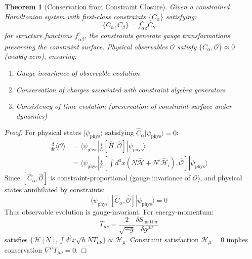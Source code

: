 \documentclass[11pt,a4paper]{article}
\newtheorem{theorem}{Theorem}[section]
\theoremstyle{remark}
\theoremstyle{definition}
\begin{document}
\begin{theorem}[Conservation from Constraint Closure]
\label{thm:conservation_from_constraints}
Given a constrained Hamiltonian system with first-class constraints $\{C_\alpha\}$ satisfying:
\begin{equation}
\{C_\alpha, C_\beta\} = f^{\gamma}_{\alpha\beta} C_\gamma
\end{equation}
for structure functions $f^{\gamma}_{\alpha\beta}$, the constraints generate gauge transformations preserving the constraint surface. Physical observables $\mathcal{O}$ satisfy $\{C_\alpha, \mathcal{O}\} \approx 0$ (weakly zero), ensuring:
\begin{enumerate}[label=(\roman*)]
\item Gauge invariance of observable evolution
\item Conservation of charges associated with constraint algebra generators
\item Consistency of time evolution (preservation of constraint surface under dynamics)
\end{enumerate}
\end{theorem}

\begin{proof}
For physical states $|\psi_{\text{phys}}\rangle$ satisfying $\hat{C}_\alpha |\psi_{\text{phys}}\rangle = 0$:
\begin{align}
\frac{d}{dt}\langle \mathcal{O} \rangle &= \langle \psi_{\text{phys}}| \frac{i}{\hbar}[\hat{H}, \hat{\mathcal{O}}] |\psi_{\text{phys}}\rangle \\
&= \langle \psi_{\text{phys}}| \frac{i}{\hbar}[\int d^3x(N\hat{\mathcal{H}} + N^i \hat{\mathcal{H}}_i), \hat{\mathcal{O}}] |\psi_{\text{phys}}\rangle
\end{align}
Since $[\hat{C}_\alpha, \hat{\mathcal{O}}]$ is constraint-proportional (gauge invariance of $\mathcal{O}$), and physical states annihilated by constraints:
\begin{equation}
\langle \psi_{\text{phys}}| [\hat{C}_\alpha, \hat{\mathcal{O}}] |\psi_{\text{phys}}\rangle = 0
\end{equation}
Thus observable evolution is gauge-invariant. For energy-momentum:
\begin{equation}
T_{\mu\nu} = \frac{2}{\sqrt{-g}} \frac{\delta S_{\text{matter}}}{\delta g^{\mu\nu}}
\end{equation}
satisfies $\{\mathcal{H}[N], \int d^3x \sqrt{h} N T_{\mu\nu}\} \propto \mathcal{H}_\mu$. Constraint satisfaction $\mathcal{H}_\mu = 0$ implies conservation $\nabla^\mu T_{\mu\nu} = 0$.
\end{proof}
\end{document}
